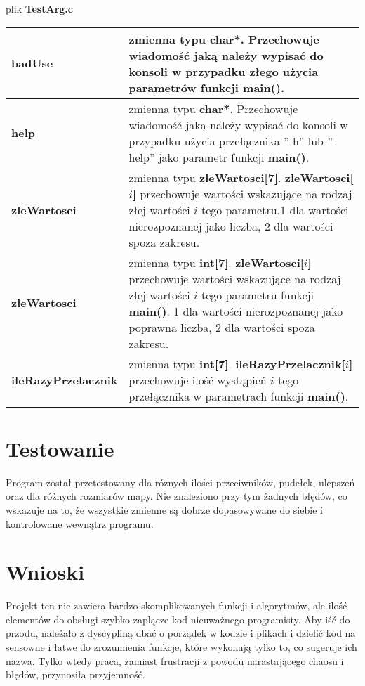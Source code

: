 \documentclass[12pt,a4paper]{article}
\begin{document}
{\Large plik \textbf{TestArg.c}}
\begin{center}
\begin{tabularx}{\linewidth}{ |l|X| } 

\hline
\textbf{badUse} &
zmienna typu \textbf{char*}. Przechowuje wiadomość jaką należy wypisać do konsoli w przypadku złego użycia parametrów funkcji \textbf{main()}.\\

\hline
\textbf{help} &
zmienna typu \textbf{char*}. Przechowuje wiadomość jaką należy wypisać do konsoli w przypadku użycia przełącznika ''-h'' lub ''-help'' jako parametr funkcji \textbf{main()}.\\

\hline
\textbf{zleWartosci} &
zmienna typu \textbf{zleWartosci[7]}. \textbf{zleWartosci[$i$]} przechowuje wartości wskazujące na rodzaj złej wartości $i$-tego parametru.1 dla wartości nierozpoznanej jako liczba, 2 dla wartości spoza zakresu.\\

\hline
\textbf{zleWartosci} &
zmienna typu \textbf{int[7]}. \textbf{zleWartosci[$i$]} przechowuje wartości wskazujące na rodzaj złej wartości $i$-tego parametru funkcji \textbf{main()}. 1 dla wartości nierozpoznanej jako poprawna liczba, 2 dla wartości spoza zakresu.\\

\hline
\textbf{ileRazyPrzelacznik} &
zmienna typu \textbf{int[7]}. \textbf{ileRazyPrzelacznik[$i$]} przechowuje ilość wystąpień $i$-tego przełącznika w parametrach funkcji \textbf{main()}.\\


\hline
\end{tabularx}
\end{center}

\section{Testowanie }\label{sec:Testowanie}
Program został przetestowany dla róznych ilości przeciwników, pudełek, ulepszeń oraz dla różnych rozmiarów mapy. Nie znaleziono przy tym żadnych błędów, co wskazuje na to, że wszystkie zmienne są dobrze dopasowywane do siebie i kontrolowane wewnątrz programu.

\section{Wnioski}
Projekt ten nie zawiera bardzo skomplikowanych funkcji i algorytmów, ale ilość elementów do obsługi szybko zaplącze kod nieuważnego programisty. Aby iść do przodu, należało z dyscypliną dbać o porządek w kodzie i plikach i dzielić kod na sensowne i łatwe do zrozumienia funkcje, które wykonują tylko to, co sugeruje ich nazwa. Tylko wtedy praca, zamiast frustracji z powodu narastającego chaosu i błędów, przynosiła przyjemność.
\end{document}
